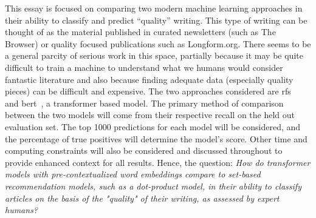 This essay is focused on comparing two modern machine learning approaches in their ability to classify and predict “quality” writing. This type of writing can be thought of as the material published in curated newsletters (such as The Browser) or quality focused publications such as Longform.org. There seems to be a general parcity of serious work in this space, partially because it may be quite difficult to train a machine to understand what we humans would consider fantastic literature and also because finding adequate data (especially quality pieces) can be difficult and expensive. The two approaches considered are \gls{rfs}~\parencite{altosaar2020rankfromsets:} and \acrshort{bert}~\parencite{devlin2019bert:}, a transformer based model. The primary method of comparison between the two models will come from their respective recall on the held out evaluation set. The top 1000 predictions for each model will be considered, and the percentage of true positives will determine the model’s score. Other time and computing constraints will also be considered and discussed throughout to provide enhanced context for all results. Hence, the question: \emph{How do transformer models with pre-contextualized word embeddings compare to set-based recommendation models, such as a dot-product model, in their ability to classify articles on the basis of the "quality" of their writing, as assessed by expert humans?}